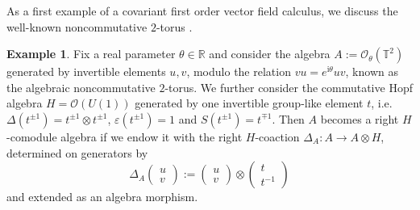 \documentclass{article}
\theoremstyle{definition}
\newtheorem{example}[thm]{Example}
\begin{document}
	As a first example of a covariant first order vector field calculus, we discuss the well-known noncommutative $2$-torus \cite{ConnesRieffel}.
	\begin{example}
		Fix a real parameter $\theta\in\mathbb{R}$ and consider the algebra $A:=\mathcal{O}_\theta(\mathbb{T}^2)$ generated by invertible elements $u,v$, modulo the relation $vu=e^{\mathrm{i}\theta}uv$, known as the algebraic noncommutative $2$-torus. We further consider the commutative Hopf algebra $H=\mathcal{O}(U(1))$ generated by one invertible group-like element $t$, i.e. $\Delta(t^{\pm 1})=t^{\pm 1}\otimes t^{\pm 1}$, $\varepsilon(t^{\pm 1})=1$ and $S(t^{\pm 1})=t^{\mp 1}$. Then $A$ becomes a right $H$-comodule algebra if we endow it with the right $H$-coaction $\Delta_A\colon A\to A\otimes H$, determined on generators by
		$$
		\Delta_A\begin{pmatrix}
			u \\
			v
		\end{pmatrix}:=\begin{pmatrix}
			u \\
			v
		\end{pmatrix}\otimes\begin{pmatrix}
			t \\
			t^{-1}
		\end{pmatrix}
		$$
		and extended as an algebra morphism.
		

\end{example}
\end{document}
